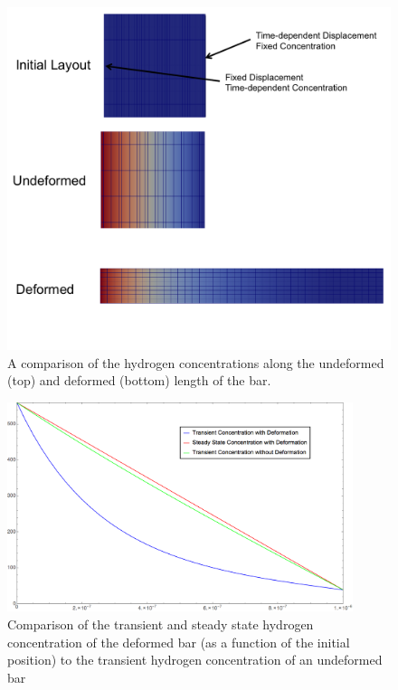 \documentclass[10pt]{elsarticle}
\begin{document}
\begin{figure}[H]
	\centering
	\includegraphics[trim = 0mm 0mm 0mm 0mm, clip,width=1.0\textwidth]{images/DeformedConcentration.png}
	\caption{A comparison of the hydrogen concentrations along the undeformed (top) and deformed (bottom) length of the bar.}
	\label{fig:DeformedConcentration}
\end{figure}

\begin{figure}[H]
	\centering
	\includegraphics[trim = 0mm 0mm 0mm 0mm, clip,width=0.9\textwidth]{images/ConcentrationPlot.png}
	\caption{Comparison of the transient and steady state hydrogen concentration of the deformed bar (as a function of the initial position) to the transient hydrogen concentration of an undeformed bar}
	\label{fig:ConcentrationPlot}
\end{figure}
\end{document}
